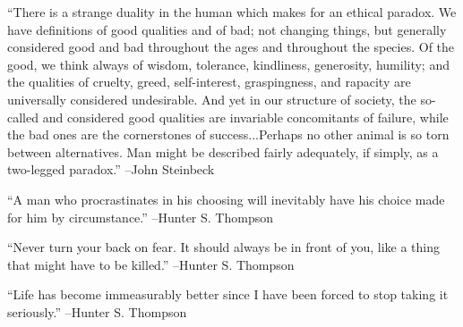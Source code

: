 \documentclass{article}%
\begin{document}
\linebreak%
\vspace{1mm}%
\begin{minipage}{\textwidth}%
\flushleft%
“There is a strange duality in the human which makes for an ethical paradox. We have definitions of good qualities and of bad; not changing things, but generally considered good and bad throughout the ages and throughout the species. Of the good, we think always of wisdom, tolerance, kindliness, generosity, humility; and the qualities of cruelty, greed, self{-}interest, graspingness, and rapacity are universally considered undesirable. And yet in our structure of society, the so{-}called and considered good qualities are invariable concomitants of failure, while the bad ones are the cornerstones of success...Perhaps no other animal is so torn between alternatives. Man might be described fairly adequately, if simply, as a two{-}legged paradox.”%
\linebreak%
\vspace{1mm}%
–John Steinbeck%
\linebreak%
\vspace{1mm}%
\end{minipage}%
\linebreak%
\vspace{1mm}%
\begin{minipage}{\textwidth}%
\flushleft%
“A man who procrastinates in his choosing will inevitably have his choice made for him by circumstance.”%
\linebreak%
\vspace{1mm}%
–Hunter S. Thompson%
\linebreak%
\vspace{1mm}%
\end{minipage}%
\linebreak%
\vspace{1mm}%
\begin{minipage}{\textwidth}%
\flushleft%
“Never turn your back on fear. It should always be in front of you, like a thing that might have to be killed.”%
\linebreak%
\vspace{1mm}%
–Hunter S. Thompson%
\linebreak%
\vspace{1mm}%
\end{minipage}%
\linebreak%
\vspace{1mm}%
\begin{minipage}{\textwidth}%
\flushleft%
“Life has become immeasurably better since I have been forced to stop taking it seriously.”%
\linebreak%
\vspace{1mm}%
–Hunter S. Thompson%
\linebreak%
\vspace{1mm}%
\end{minipage}%
\end{document}
